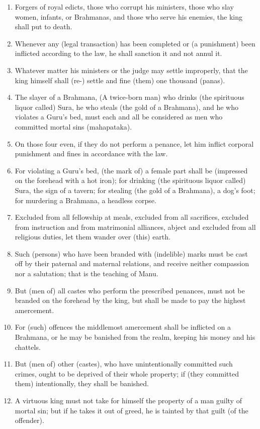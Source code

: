\begin{enumerate}
\item Forgers of royal edicts, those who corrupt his ministers, those who slay women, infants, or Brahmanas, and those who serve his enemies, the king shall put to death.
\item Whenever any (legal transaction) has been completed or (a punishment) been inflicted according to the law, he shall sanction it and not annul it.
\item Whatever matter his ministers or the judge may settle improperly, that the king himself shall (re-) settle and fine (them) one thousand (panas).
\item The slayer of a Brahmana, (A twice-born man) who drinks (the spirituous liquor called) Sura, he who steals (the gold of a Brahmana), and he who violates a Guru's bed, must each and all be considered as men who committed mortal sins (mahapataka).
\item On those four even, if they do not perform a penance, let him inflict corporal punishment and fines in accordance with the law.
\item For violating a Guru's bed, (the mark of) a female part shall be (impressed on the forehead with a hot iron); for drinking (the spirituous liquor called) Sura, the sign of a tavern; for stealing (the gold of a Brahmana), a dog's foot; for murdering a Brahmana, a headless corpse.
\item Excluded from all fellowship at meals, excluded from all sacrifices, excluded from instruction and from matrimonial alliances, abject and excluded from all religious duties, let them wander over (this) earth.
\item Such (persons) who have been branded with (indelible) marks must be cast off by their paternal and maternal relations, and receive neither compassion nor a salutation; that is the teaching of Manu.
\item But (men of) all castes who perform the prescribed penances, must not be branded on the forehead by the king, but shall be made to pay the highest amercement.
\item For (such) offences the middlemost amercement shall be inflicted on a Brahmana, or he may be banished from the realm, keeping his money and his chattels.
\item But (men of) other (castes), who have unintentionally committed such crimes, ought to be deprived of their whole property; if (they committed them) intentionally, they shall be banished.
\item A virtuous king must not take for himself the property of a man guilty of mortal sin; but if he takes it out of greed, he is tainted by that guilt (of the offender).

\end{enumerate}

